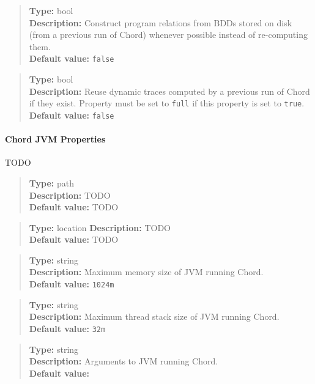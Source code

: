 \begin{quote}
{\bf Type:} bool  \\
{\bf Description:} Construct program relations from BDDs stored on disk (from a previous run of Chord) whenever possible instead of re-computing them. \\
{\bf Default value:} {\tt false}
\end{quote}

\begin{quote}
{\bf Type:} bool \\
{\bf Description:} Reuse dynamic traces computed by a previous run of Chord if they exist.  Property  must be set to {\tt full} if this property is set to {\tt true}. \\
{\bf Default value:} {\tt false}
\end{quote}

\paragraph{Chord JVM Properties}

TODO

\begin{quote}
{\bf Type:} path \\
{\bf Description:} TODO \\
{\bf Default value:} TODO
\end{quote}

\begin{quote}
{\bf Type:} location
{\bf Description:} TODO \\
{\bf Default value:} TODO
\end{quote}

\begin{quote}
{\bf Type:} string \\
{\bf Description:} Maximum memory size of JVM running Chord. \\
{\bf Default value:} {\tt 1024m}
\end{quote}

\begin{quote}
{\bf Type:} string \\
{\bf Description:} Maximum thread stack size of JVM running Chord. \\
{\bf Default value:} {\tt 32m}
\end{quote}

\begin{quote}
{\bf Type:} string \\
{\bf Description:} Arguments to JVM running Chord. \\
{\bf Default value:}    
\end{quote}

